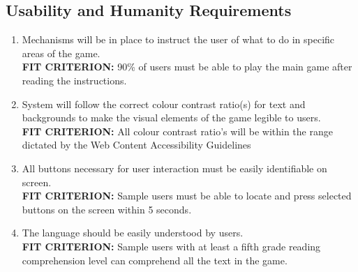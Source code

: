 \documentclass[12pt, titlepage]{article}
\begin{document}
\subsection{Usability and Humanity Requirements}
\begin{enumerate}[{UHR}1. ]
    \item Mechanisms will be in place to instruct the user of what to do in specific areas of the game.
    \\\textbf{FIT CRITERION:} 90\% of users must be able to play the main game after reading the instructions.
    
    \item System will follow the correct colour contrast ratio(s) for text and backgrounds to make the visual elements of the game legible to users.
    \\\textbf{FIT CRITERION:} All colour contrast ratio's will be within the range dictated by the Web Content Accessibility Guidelines \cite{contrast}
    
    \item All buttons necessary for user interaction must be easily identifiable on screen.
    \\\textbf{FIT CRITERION:} Sample users must be able to locate and press selected buttons on the screen within 5 seconds.
    
    \item The language should be easily understood by users.
    \\\textbf{FIT CRITERION:} Sample users with at least a fifth grade reading comprehension level can comprehend all the text in the game.
\end{enumerate}
\end{document}
